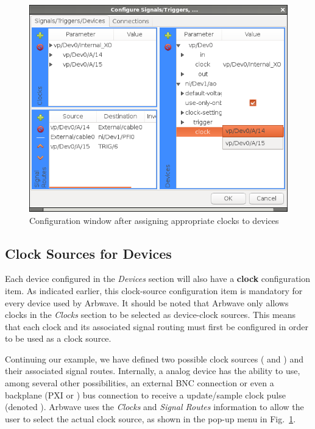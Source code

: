\begin{figure}[htb!]
  \centerline{\includegraphics[width=.46\textwidth]{figures/devices-set-clocks}}
  \caption{Configuration window after assigning appropriate clocks to
  devices}
  \label{fig:devcfg:devices}
\end{figure}

\subsection{Clock Sources for Devices}\label{sec:devcfg:clksrc}
Each device configured in the \textit{Devices} section will also have a
\textbf{clock} configuration item.  As indicated earlier, this clock-source
configuration item is mandatory for every device used by Arbwave.  It should be
noted that Arbwave only allows clocks in the \textit{Clocks} section to be
selected as device-clock sources.  This means that each clock and its associated
signal routing must first be configured in order to be used as a clock source.

Continuing our example, we have defined two possible clock sources
( and ) and their associated signal
routes.  Internally, a  analog device has the ability to use,
among several other possibilities, an external BNC connection or even a
backplane (PXI or ) bus connection to receive a update/sample clock
pulse (denoted ).  Arbwave uses the \textit{Clocks} and
\textit{Signal Routes} information to allow the user to select the actual clock
source, as shown in the pop-up menu in Fig.~\ref{fig:devcfg:devices}.
